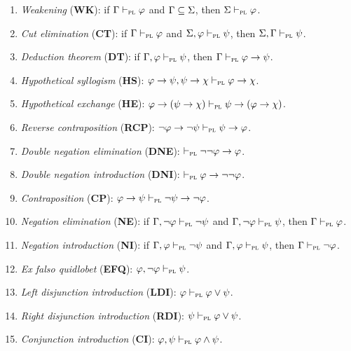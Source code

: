 \documentclass[a4paper, 11pt]{article} %
\begin{document}
\begin{enumerate}[itemsep=2pt]\small
	\item \textit{Weakening} (\textbf{WK}): if $\Gamma \vdash_{\textsc{pl}} \varphi$ and $\Gamma \subseteq \Sigma$, then $\Sigma \vdash_{\textsc{pl}} \varphi$.
	\item \textit{Cut elimination} (\textbf{CT}): if $\Gamma \vdash_{\textsc{pl}} \varphi$ and $\Sigma, \varphi \vdash_{\textsc{pl}} \psi$, then $\Sigma,\Gamma \vdash_{\textsc{pl}} \psi$.
	\item \textit{Deduction theorem} (\textbf{DT}): if $\Gamma, \varphi \vdash_{\textsc{pl}} \psi$, then $\Gamma \vdash_{\textsc{pl}} \varphi \rightarrow \psi$.
	\item \textit{Hypothetical syllogism} (\textbf{HS}): $\varphi \rightarrow \psi, \psi \rightarrow \chi \vdash_{\textsc{pl}} \varphi \rightarrow \chi$.
	\item \textit{Hypothetical exchange} (\textbf{HE}): $\varphi \rightarrow (\psi \rightarrow \chi) \vdash_{\textsc{pl}} \psi \rightarrow (\varphi \rightarrow \chi)$.
	\item \textit{Reverse contraposition} (\textbf{RCP}): $\neg\varphi \rightarrow \neg\psi \vdash_{\textsc{pl}} \psi \rightarrow \varphi$.
	\item \textit{Double negation elimination} (\textbf{DNE}): $\vdash_{\textsc{pl}} \neg\neg\varphi \rightarrow \varphi$.
	\item \textit{Double negation introduction} (\textbf{DNI}): $\vdash_{\textsc{pl}} \varphi \rightarrow \neg\neg\varphi$.
	\item \textit{Contraposition} (\textbf{CP}): $\varphi \rightarrow \psi \vdash_{\textsc{pl}} \neg\psi \rightarrow \neg\varphi$.
	\item \textit{Negation elimination} (\textbf{NE}): if $\Gamma, \neg\varphi \vdash_{\textsc{pl}} \neg\psi$ and $\Gamma, \neg\varphi \vdash_{\textsc{pl}} \psi$, then $\Gamma \vdash_{\textsc{pl}} \varphi$.
	\item \textit{Negation introduction} (\textbf{NI}): if $\Gamma, \varphi \vdash_{\textsc{pl}} \neg\psi$ and $\Gamma, \varphi \vdash_{\textsc{pl}} \psi$, then $\Gamma \vdash_{\textsc{pl}} \neg\varphi$.
	\item \textit{Ex falso quidlobet} (\textbf{EFQ}): $\varphi, \neg\varphi \vdash_{\textsc{pl}} \psi$.
	\item \textit{Left disjunction introduction} (\textbf{LDI}): $\varphi \vdash_{\textsc{pl}} \varphi \vee \psi$.
	\item \textit{Right disjunction introduction} (\textbf{RDI}): $\psi \vdash_{\textsc{pl}} \varphi \vee \psi$.
	\item \textit{Conjunction introduction} (\textbf{CI}): $\varphi, \psi \vdash_{\textsc{pl}} \varphi \wedge \psi$.

\end{enumerate}
\end{document}
